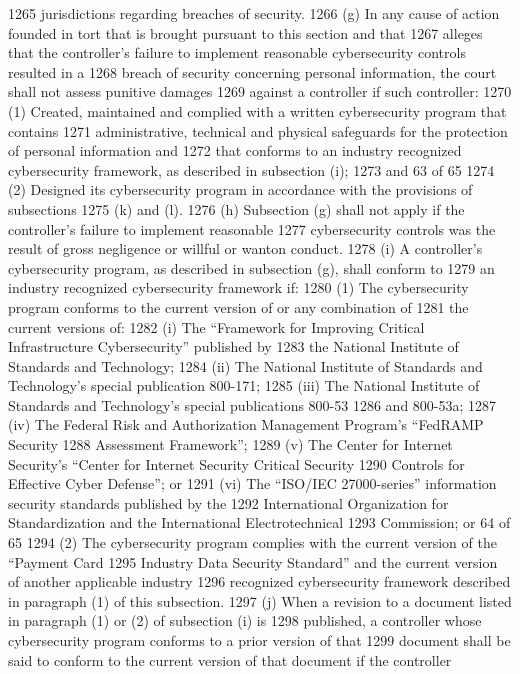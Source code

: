 1265 jurisdictions regarding breaches of security.
1266 (g) In any cause of action founded in tort that is brought pursuant to this section and that
1267 alleges that the controller’s failure to implement reasonable cybersecurity controls resulted in a
1268 breach of security concerning personal information, the court shall not assess punitive damages
1269 against a controller if such controller:
1270 (1) Created, maintained and complied with a written cybersecurity program that contains
1271 administrative, technical and physical safeguards for the protection of personal information and
1272 that conforms to an industry recognized cybersecurity framework, as described in subsection (i);
1273 and
63 of 65
1274 (2) Designed its cybersecurity program in accordance with the provisions of subsections
1275 (k) and (l).
1276 (h) Subsection (g) shall not apply if the controller’s failure to implement reasonable
1277 cybersecurity controls was the result of gross negligence or willful or wanton conduct.
1278 (i) A controller’s cybersecurity program, as described in subsection (g), shall conform to
1279 an industry recognized cybersecurity framework if:
1280 (1) The cybersecurity program conforms to the current version of or any combination of
1281 the current versions of:
1282 (i) The “Framework for Improving Critical Infrastructure Cybersecurity” published by
1283 the National Institute of Standards and Technology;
1284 (ii) The National Institute of Standards and Technology's special publication 800-171;
1285 (iii) The National Institute of Standards and Technology's special publications 800-53
1286 and 800-53a;
1287 (iv) The Federal Risk and Authorization Management Program's “FedRAMP Security
1288 Assessment Framework”;
1289 (v) The Center for Internet Security’s “Center for Internet Security Critical Security
1290 Controls for Effective Cyber Defense”; or
1291 (vi) The “ISO/IEC 27000-series” information security standards published by the
1292 International Organization for Standardization and the International Electrotechnical
1293 Commission; or
64 of 65
1294 (2) The cybersecurity program complies with the current version of the “Payment Card
1295 Industry Data Security Standard” and the current version of another applicable industry
1296 recognized cybersecurity framework described in paragraph (1) of this subsection.
1297 (j) When a revision to a document listed in paragraph (1) or (2) of subsection (i) is
1298 published, a controller whose cybersecurity program conforms to a prior version of that
1299 document shall be said to conform to the current version of that document if the controller
